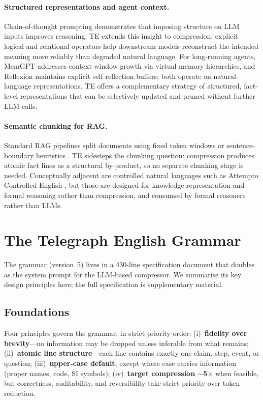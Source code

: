 \documentclass{article}
\begin{document}
\paragraph{Structured representations and agent context.}
Chain-of-thought prompting \citep{wei2022cot} demonstrates that imposing structure on LLM inputs improves reasoning. TE extends this insight to compression: explicit logical and relational operators help downstream models reconstruct the intended meaning more reliably than degraded natural language. For long-running agents, MemGPT \citep{packer2023memgpt} addresses context-window growth via virtual memory hierarchies, and Reflexion \citep{shinn2023reflexion} maintains explicit self-reflection buffers; both operate on natural-language representations. TE offers a complementary strategy of structured, fact-level representations that can be selectively updated and pruned without further LLM calls.

\paragraph{Semantic chunking for RAG.}
Standard RAG pipelines split documents using fixed token windows or sentence-boundary heuristics \citep{lewis2020rag,gao2023rag}. TE sidesteps the chunking question: compression produces atomic fact lines as a structural by-product, so no separate chunking stage is needed. Conceptually adjacent are controlled natural languages such as Attempto Controlled English \citep{fuchs2008attempto}, but those are designed for knowledge representation and formal reasoning rather than compression, and consumed by formal reasoners rather than LLMs.

\section{The Telegraph English Grammar}
\label{sec:grammar}

The grammar (version~5) lives in a 430-line specification document that doubles as the system prompt for the LLM-based compressor. We summarise its key design principles here; the full specification is supplementary material.

\subsection{Foundations}

Four principles govern the grammar, in strict priority order: (i)~\textbf{fidelity over brevity}---no information may be dropped unless inferable from what remains; (ii)~\textbf{atomic line structure}---each line contains exactly one claim, step, event, or question; (iii)~\textbf{upper-case default}, except where case carries information (proper names, code, SI symbols); (iv)~\textbf{target compression $\sim$5$\times$} when feasible, but correctness, auditability, and reversibility take strict priority over token reduction.
\end{document}
